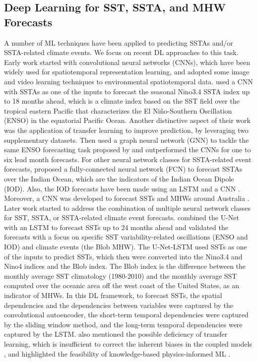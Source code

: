 \documentclass[11pt, a4paper]{article}
\begin{document}
\subsection{Deep Learning for SST, SSTA, and MHW Forecasts}

A number of ML techniques have been applied to predicting SSTAs and/or SSTA-related climate events. We focus on recent DL approaches to this task. Early work started with convolutional neural networks (CNNs), which have been widely used for spatiotemporal representation learning, and adopted some image and video learning techniques to environmental spatiotemporal data. \citet{ham2019deep,ham2021unified} used a CNN with SSTAs as one of the inputs to forecast the seasonal Nino3.4 SSTA index up to 18 months ahead, which is a climate index based on the SST field over the tropical eastern Pacific that characterizes the El Ni\~{n}o-Southern Oscillation (ENSO) in the equatorial Pacific Ocean. Another distinctive aspect of their work was the application of transfer learning to improve prediction, by leveraging two supplementary datasets. Then \citet{cachay2021world} used a graph neural network (GNN) to tackle the same ENSO forecasting task proposed by \citet{ham2019deep} and outperformed the CNNs for one to six lead month forecasts. For other neural network classes for SSTA-related event forecasts, \citet{ratnam2020machine} proposed a fully-connected neural network (FCN) to forecast SSTAs over the Indian Ocean, which are the indicators of the Indian Ocean Dipole (IOD). Also, the IOD forecasts have been made using an LSTM \citep{pravallika2022prediction} and a CNN \citep{fengpredictability}. Moreover, a CNN was developed to forecast SSTs and MHWs around Australia \citep{boschetti2022sea}. Later work started to address the combination of multiple neural network classes for SST, SSTA, or SSTA-related climate event forecasts. \citet{taylor2022deep} combined the U-Net \citep{ronneberger2015u} with an LSTM to forecast SSTs up to 24 months ahead and validated the forecasts with a focus on specific SST variability-related oscillations (ENSO and IOD) and climate events (the Blob MHW). The U-Net-LSTM used SSTs as one of the inputs to predict SSTs, which then were converted into the Nino3.4 and Nino4 indices and the Blob index. The Blob index is the difference between the monthly average SST climatology (1980-2010) and the monthly average SST computed over the oceanic area off the west coast of the United States, as an indicator of MHWs. In this DL framework, to forecast SSTs, the spatial dependencies and the dependencies between variables were captured by the convolutional autoencoder, the short-term temporal dependencies were captured by the sliding window method, and the long-term temporal dependencies were captured by the LSTM. \citet{taylor2022deep} also mentioned the possible deficiency of transfer learning, which is insufficient to correct the inherent biases in the coupled models \citep{timmermann2018nino}, and highlighted the feasibility of knowledge-based physics-informed ML \citep{karniadakis2021physics}.
\end{document}
